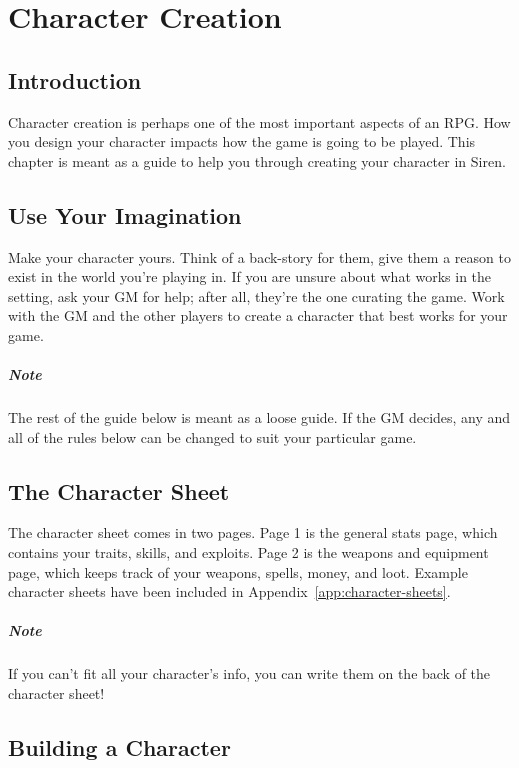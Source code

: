 \chapter{Character Creation}\label{chap:char-creat}
\section{Introduction}
Character creation is perhaps one of the most important aspects of an RPG.
How you design your character impacts how the game is going to be played.
This chapter is meant as a guide to help you through creating your character in Siren.

\section{Use Your Imagination}
Make your character yours.
Think of a back-story for them, give them a reason to exist in the world you're playing in.
If you are unsure about what works in the setting, ask your GM for help; after all, they're the one curating the game.
Work with the GM and the other players to create a character that best works for your game.

\paragraph{Note} The rest of the guide below is meant as a loose guide.
If the GM decides, any and all of the rules below can be changed to suit your particular game.

\section{The Character Sheet}
The character sheet comes in two pages.
Page 1 is the general stats page, which contains your traits, skills, and exploits.
Page 2 is the weapons and equipment page, which keeps track of your weapons, spells, money, and loot.
Example character sheets have been included in Appendix~\ref{app:character-sheets}.

\paragraph{Note} If you can't fit all your character's info, you can write them on the back of the character sheet!

\section{Building a Character}
